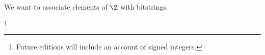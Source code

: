 

We want to associate elements of $\Z$ with bitstrings.


\footnote{Future editions will include an account of signed integers.}


\blankpage
